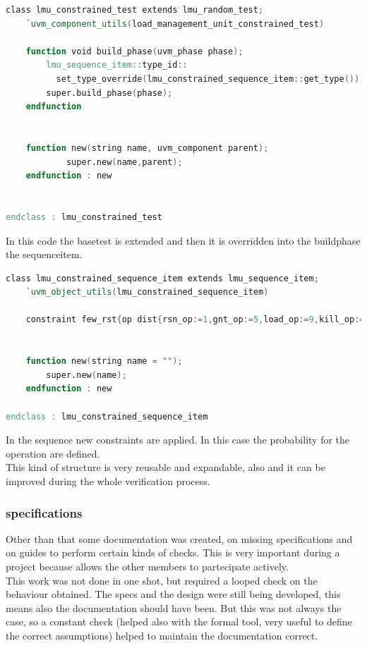 \linespread{1}
\begin{lstlisting}[language=Verilog,style=verilog-style, backgroundcolor=\color{lyel_palette}, frame=tlb]
class lmu_constrained_test extends lmu_random_test;
    `uvm_component_utils(load_management_unit_constrained_test)

	function void build_phase(uvm_phase phase);
		lmu_sequence_item::type_id::
		  set_type_override(lmu_constrained_sequence_item::get_type());
		super.build_phase(phase);
	endfunction


	function new(string name, uvm_component parent);
      		super.new(name,parent);
   	endfunction : new


endclass : lmu_constrained_test
\end{lstlisting}
\linespread{1.2}
In this code the base\+test is extended and then it is overridden into the build\+phase the sequence\+item.\\
\linespread{1}
\begin{lstlisting}[language=Verilog,style=verilog-style, backgroundcolor=\color{lyel_palette}, frame=tlb]
class lmu_constrained_sequence_item extends lmu_sequence_item;
	`uvm_object_utils(lmu_constrained_sequence_item)

	constraint few_rst{op dist{rsn_op:=1,gnt_op:=5,load_op:=9,kill_op:=2};}
	

	function new(string name = "");
		super.new(name);
	endfunction : new

endclass : lmu_constrained_sequence_item
\end{lstlisting}
\linespread{1.2}
In the sequence new constraints are applied. In this case the probability for the operation are defined.\\

This kind of structure is very reusable and expandable, also and it can be improved during the whole verification process.\\

\subsubsection{specifications}
Other than that some documentation was created, on missing specifications and on guides to perform certain kinds of checks. This is very important during a project because allows the other members to partecipate actively.\\

This work was not done in one shot, but required a looped check on the behaviour obtained. The specs and the design were still being developed, this means also the documentation should have been. But this was not always the case, so a constant check (helped also with the formal tool, very useful to define the correct assumptions) helped to maintain the documentation correct.\\

